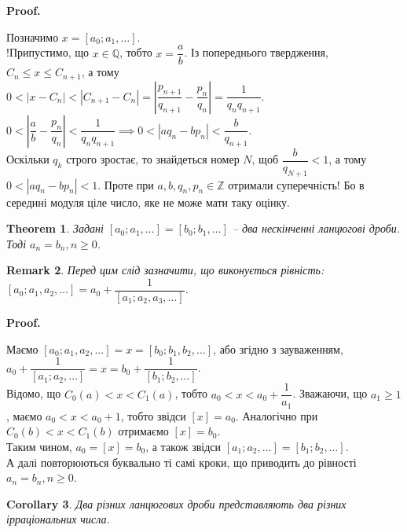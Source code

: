 \documentclass[a4paper, 10pt]{article}
\makeatletter
\theoremstyle{theoremdd}
\newtheorem{theorem}{Theorem}[subsection]
\theoremstyle{theoremdd}
\theoremstyle{theoremdd}
\theoremstyle{theoremdd}
\theoremstyle{theoremdd}
\theoremstyle{theoremdd}
\newtheorem{remark}[theorem]{Remark}
\theoremstyle{theoremdd}
\theoremstyle{theoremdd}
\newtheorem{corollary}[theorem]{Corollary}
\renewenvironment{proof}[1][Proof.\\]{\par
\pushQED{\hfill \qed}%
\normalfont \topsep6\p@\@plus6\p@\relax
\trivlist
\item\relax
{\bfseries
#1\@addpunct{.}}\hspace\labelsep\ignorespaces
}{%
\popQED\endtrivlist\@endpefalse
}
\makeatother
\begin{document}
\begin{proof}
Позначимо $x = [a_0;a_1,\dots]$.\\
!Припустимо, що $x \in \mathbb{Q}$, тобто $x = \dfrac{a}{b}$. Із попереднього твердження, $C_n \leq x \leq C_{n+1}$, а тому\\
$0 < |x-C_n| < |C_{n+1}-C_n| = \left| \dfrac{p_{n+1}}{q_{n+1}} - \dfrac{p_n}{q_n} \right| = \dfrac{1}{q_n q_{n+1}}$.\\
$0 < \left| \dfrac{a}{b} - \dfrac{p_n}{q_n} \right| < \dfrac{1}{q_n q_{n+1}} \implies 0 < |aq_n - bp_n| < \dfrac{b}{q_{n+1}}$.\\
Оскільки $q_k$ строго зростає, то знайдеться номер $N$, щоб $\dfrac{b}{q_{N+1}} < 1$, а тому $0 < |aq_n - bp_n| < 1$. Проте при $a,b,q_n,p_n \in \mathbb{Z}$ отримали суперечність! Бо в середині модуля ціле число, яке не може мати таку оцінку.
\end{proof}

\begin{theorem}
Задані $[a_0;a_1,\dots] = [b_0;b_1,\dots]$ -- два нескінченні ланцюгові дроби. Тоді $a_n = b_n, n \geq 0$.
\end{theorem}

\begin{remark}
Перед цим слід зазначити, що виконується рівність:\\
$[a_0;a_1,a_2,\dots] = a_0 + \dfrac{1}{[a_1;a_2,a_3,\dots]}$.
\end{remark}

\begin{proof}
Маємо $[a_0;a_1,a_2,\dots] = x = [b_0;b_1,b_2,\dots]$, або згідно з зауваженням,\\
$a_0 + \dfrac{1}{[a_1;a_2,\dots]} = x = b_0 + \dfrac{1}{[b_1;b_2,\dots]}$.\\
Відомо, що $C_0(a) < x < C_1(a)$, тобто $a_0 < x < a_0 + \dfrac{1}{a_1}$. Зважаючи, що $a_1 \geq 1$, маємо $a_0 < x < a_0+1$, тобто звідси $[x] = a_0$. Аналогічно при $C_0(b) < x < C_1(b)$ отримаємо $[x] = b_0$.\\
Таким чином, $a_0 = [x] = b_0$, а також звідси $[a_1;a_2,\dots] = [b_1;b_2,\dots]$.\\
А далі повторюються буквально ті самі кроки, що приводить до рівності $a_n = b_n, n \geq 0$.
\end{proof}

\begin{corollary}
Два різних ланцюгових дроби представляють два різних ірраціональних числа.
\end{corollary}
\end{document}

